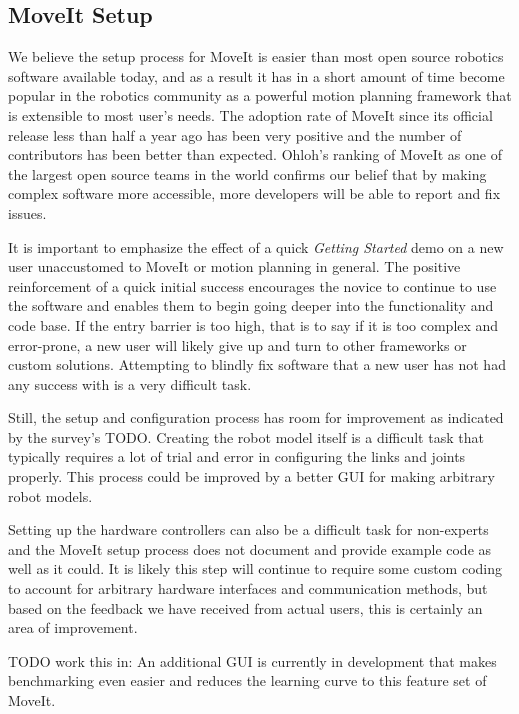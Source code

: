 \documentclass[10pt,journal,compsoc]{joser1}
\begin{document}
{\subsection{MoveIt Setup}
\label{sec::moveit_discussion}

We believe the setup process for MoveIt is easier than most open source robotics software available today, and as a result it has in a short amount of time become popular in the robotics community as a powerful motion planning framework that is extensible to most user's needs. The adoption rate of MoveIt since its official release less than half a year ago has been very positive and the number of contributors has been better than expected. Ohloh's ranking of MoveIt as one of the largest open source teams in the world confirms our belief that by making complex software more accessible, more developers will be able to report and fix issues. 

It is important to emphasize the effect of a quick \textit{Getting Started} demo on a new user unaccustomed to MoveIt or motion planning in general. The positive reinforcement of a quick initial success encourages the novice to continue to use the software and enables them to begin going deeper into the functionality and code base. If the entry barrier is too high, that is to say if it is too complex and error-prone, a new user will likely give up and turn to other frameworks or custom solutions. Attempting to blindly fix software that a new user has not had any success with is a very difficult task.

Still, the setup and configuration process has room for improvement as indicated by the survey's TODO. Creating the robot model itself is a difficult task that typically requires a lot of trial and error in configuring the links and joints properly. This process could be improved by a better GUI for making arbitrary robot models. 

Setting up the hardware controllers can also be a difficult task for non-experts and the MoveIt setup process does not document and provide example code as well as it could. It is likely this step will continue to require some custom coding to account for arbitrary hardware interfaces and communication methods, but based on the feedback we have received from actual users, this is certainly an area of improvement. 

TODO work this in: An additional GUI is currently in development that makes benchmarking even easier and reduces the learning curve to this feature set of MoveIt.

}
\end{document}
